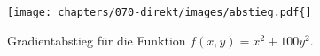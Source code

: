 %
%
%
\begin{figure}
\centering
\texttt{[image: chapters/070-direkt/images/abstieg.pdf\{]}
\caption{Gradientabstieg für die Funktion $f(x,y)=x^2+100y^2$.
\label{buch:direkt:gradient:fig:abstieg}}
\end{figure}
